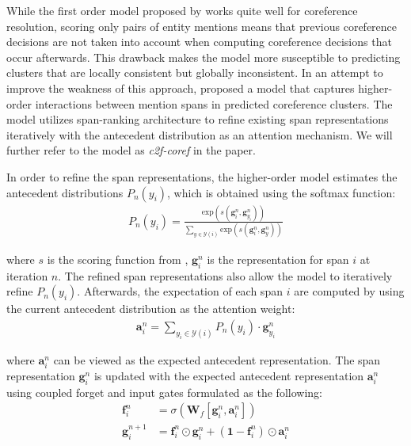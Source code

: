 \documentclass[11pt]{article}
\begin{document}
While the first order model proposed by \parencite{lee2017end} works quite well for coreference resolution, scoring only pairs of entity mentions means that previous coreference decisions are not taken into account when computing coreference decisions that occur afterwards. This drawback makes the model more susceptible to predicting clusters that are locally consistent but globally inconsistent. In an attempt to improve the weakness of this approach, \parencite{lee2018higher} proposed a model that captures higher-order interactions between mention spans in predicted coreference clusters. The model utilizes span-ranking architecture to refine existing span representations iteratively with the antecedent distribution as an attention mechanism. We will further refer to the model as \textit{c2f-coref} in the paper.

In order to refine the span representations, the higher-order model estimates the antecedent distributions $P_{n}(y_{i})$, which is obtained using the softmax function:
\begin{align}
P_{n}(y_{i}) = \frac{\text{exp}(s(\pmb{g}_{i}^{n}, \pmb{g}_{y_{i}}^{n}))}{\sum_{y \in \mathcal{Y}(i)} \text{exp}(s(\pmb{g}_{i}^{n}, \pmb{g}_{y}^{n}))}
\end{align}

where $s$ is the scoring function from \parencite{lee2017end}, $\pmb{g}_{i}^{n}$ is the representation for span $i$ at iteration $n$. The refined span representations also allow the model to iteratively refine $P_{n}(y_{i})$. Afterwards, the expectation of each span $i$ are computed by using the current antecedent distribution as the attention weight:
\begin{align}
\pmb{a}_{i}^{n} = \sum\limits_{y_{i} \in \mathcal{Y}(i)} P_{n}(y_{i}) \cdot \pmb{g}_{y_{i}}^{n}
\end{align}

where $\pmb{a}_{i}^{n}$ can be viewed as the expected antecedent representation. The span representation $\pmb{g}_{i}^{n}$ is updated with the expected antecedent representation $\pmb{a}_{i}^{n}$ using coupled forget and input gates formulated as the following:
\begin{align}
\pmb{f}_{i}^{n} &= \sigma(\textbf{W}_{f}[\pmb{g}_{i}^{n}, \pmb{a}_{i}^{n}]) \\
\pmb{g}_{i}^{n+1} &= \pmb{f}_{i}^{n} \odot \pmb{g}_{i}^{n} + (\mathbf{1} - \pmb{f}_{i}^{n}) \odot \pmb{a}_{i}^{n}
\end{align}
\end{document}
